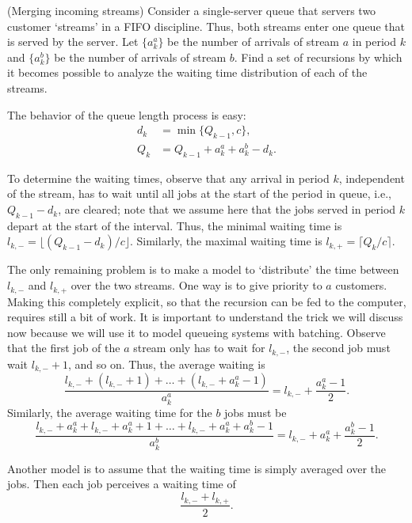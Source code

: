 \begin{question} (Merging incoming streams)
  Consider a single-server queue that servers two customer `streams'
  in a FIFO discipline. Thus, both streams enter one queue that is
  served by the server. Let $\{a_k^a\}$ be the number of arrivals of
  stream $a$ in period $k$ and $\{a_k^b\}$ be the number of arrivals
  of stream $b$. Find a set of recursions by which it becomes possible
  to analyze the waiting time distribution of each of the streams.
  \begin{solution}
    The behavior of the queue length  process is easy: 
    \begin{equation*}
      \begin{split}
      d_k &= \min\{Q_{k-1}, c\}, \\
Q_k &= Q_{k-1}+a_k^a + a_k^b - d_k.
      \end{split}
    \end{equation*}

    To determine the waiting times, observe that any arrival in period
    $k$, independent of the stream, has to wait until all jobs at the
    start of the period in queue, i.e., $Q_{k-1}-d_k$, are cleared;
    note that we assume here that the jobs served in period $k$ depart
    at the start of the interval. Thus, the minimal waiting time is
    $l_{k,-} = \lfloor (Q_{k-1}-d_k)/c\rfloor$.  Similarly, the
    maximal waiting time is $l_{k,+} = \lceil Q_k /c\rceil$.

    The only remaining problem is to make a model to `distribute' the
    time between $l_{k,-}$ and $l_{k,+}$ over the two streams. One way
    is to give priority to $a$ customers.  Making this completely
    explicit, so that the recursion can be fed to the computer,
    requires still a bit of work.  It is important to understand the
    trick we will discuss now because we will use it to model queueing
    systems with batching. Observe that the first job of the $a$
    stream only has to wait for $l_{k,-}$, the second job must wait $l_{k,-}+1$, and so on. Thus, the average waiting is 
    \begin{equation*}
      \frac{l_{k,-} + (l_{k,-} + 1) + \ldots + (l_{k,-} + a_k^a-1)}{a_k^a} = l_{k,-} + \frac{a_k^a-1}2.
    \end{equation*}
Similarly, the average waiting time for the $b$ jobs must be
    \begin{equation*}
      \frac{l_{k,-} + a_k^a + l_{k,-} + a_k^a + 1 + \ldots + l_{k,-} + a_k^a + a_k^b -1}{a_k^b} = l_{k,-} + a_k^a + \frac{a_k^b-1}2.
    \end{equation*}

    Another model is to assume that the waiting time is simply
    averaged over the jobs. Then each job perceives a waiting time of
    \begin{equation*}
      \frac{l_{k,-} + l_{k,+}}2.
    \end{equation*}
  \end{solution}
\end{question}




